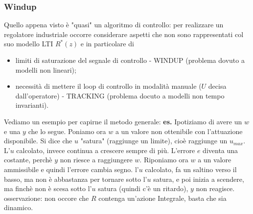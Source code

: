     \subsubsection{Windup}
    Quello appena visto è "quasi" un algoritmo di controllo: per realizzare un regolatore industriale occorre considerare aspetti che non sono rappresentati col suo modello LTI $R^*(z)$ e in particolare di 
    \begin{itemize}
        \item limiti di saturazione del segnale di controllo - WINDUP (problema dovuto a modelli non lineari);
        \item necessità di mettere il loop di controllo in modalità manuale ($U$ decisa dall'operatore) - TRACKING (problema docuto a modelli non tempo invarianti).
    \end{itemize}
    Vediamo un esempio per capirne il metodo generale:\newline
    \textbf{es.}\newline
    Ipotiziamo di avere un $w$ e una $y$ che lo segue.\newline
    Poniamo ora $w$ a un valore non ottenibile con l'attuazione disponibile.\newline
    Si dice che $u$ "satura" (raggiunge un limite), cioè raggiunge un $u_{max}$.\newline
    L'$u$ calcolato, invece continua a crescere sempre di più.\newline
    L'errore $e$ diventa una costante, perchè $y$ non riesce a raggiungere $w$.\newline
    Riponiamo ora $w$ a un valore ammissibile e quindi l'errore cambia segno.\newline
    l'$u$ calcolato, fa un saltino verso il basso, ma non è abbastanza per tornare sotto l'$u$ satura, e poi inizia a scendere, ma finchè non è scesa sotto l'$u$ satura (quindi c'è un ritardo), $y$ non reagisce.\newline
    \newline
    osservazione: non occore che $R$ contenga un'azione Integrale, basta che sia dinamico.

